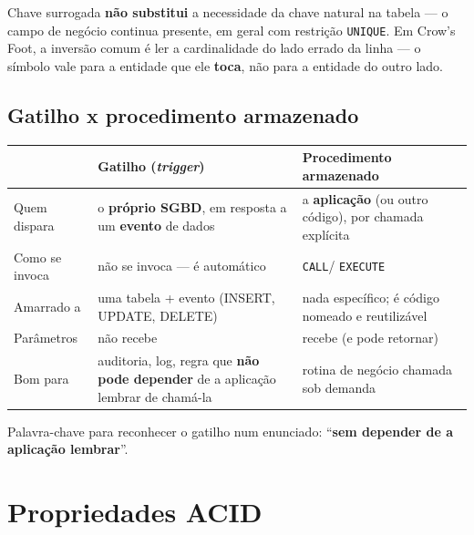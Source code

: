 \begin{cuidado}
Chave surrogada \textbf{não substitui} a necessidade da chave natural na
tabela --- o campo de negócio continua presente, em geral com restrição
\texttt{UNIQUE}. Em Crow's Foot, a inversão comum é ler a cardinalidade
do lado errado da linha --- o símbolo vale para a entidade que ele
\textbf{toca}, não para a entidade do outro lado.
\end{cuidado}

\subsection{Gatilho x procedimento armazenado}

\begin{conceito}
\begin{center}
\begin{tabular}{@{}p{2.4cm}p{4.8cm}p{4.8cm}@{}}
\toprule
& \textbf{Gatilho (\textit{trigger})} & \textbf{Procedimento armazenado} \\
\midrule
Quem dispara & o \textbf{próprio SGBD}, em resposta a um \textbf{evento}
de dados & a \textbf{aplicação} (ou outro código), por chamada explícita \\
Como se invoca & não se invoca --- é automático & \texttt{CALL}/
\texttt{EXECUTE} \\
Amarrado a & uma tabela + evento (INSERT, UPDATE, DELETE) & nada
específico; é código nomeado e reutilizável \\
Parâmetros & não recebe & recebe (e pode retornar) \\
Bom para & auditoria, log, regra que \textbf{não pode depender} de a
aplicação lembrar de chamá-la & rotina de negócio chamada sob demanda \\
\bottomrule
\end{tabular}
\end{center}
Palavra-chave para reconhecer o gatilho num enunciado: “\textbf{sem
depender de a aplicação lembrar}”.
\end{conceito}

\section{Propriedades ACID}

